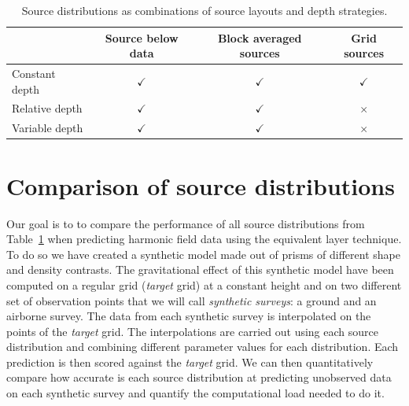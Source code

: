 \documentclass[twocolumn]{article}
\begin{document}
\begin{table}
    \centering
    \caption{
        Source distributions as combinations of source layouts and depth
        strategies.
    }
    \label{tab:source-distributions}
    \begin{tabular}{lccc}
        & Source below data & Block averaged sources & Grid sources \\ \hline
        Constant depth & $\checkmark$ & $\checkmark$ & $\checkmark$ \\
        Relative depth & $\checkmark$ & $\checkmark$ & $\times$     \\
        Variable depth & $\checkmark$ & $\checkmark$ & $\times$     \\
    \end{tabular}
\end{table}



\section{Comparison of source distributions}


Our goal is to to compare the performance of all source distributions from
Table~\ref{tab:source-distributions} when predicting harmonic field data using
the equivalent layer technique.
To do so we have created a synthetic model made out of prisms of different
shape and density contrasts.
The gravitational effect of this synthetic model have been computed on
a regular grid (\emph{target} grid) at a constant height and on two different
set of observation points that we will call \emph{synthetic surveys}: a ground
and an airborne survey.
The data from each synthetic survey is interpolated on the points of the
\emph{target} grid.
The interpolations are carried out using each source distribution and combining
different parameter values for each distribution.
Each prediction is then scored against the \emph{target} grid.
We can then quantitatively compare how accurate is each source distribution at
predicting unobserved data on each synthetic survey and quantify the
computational load needed to do it.
\end{document}
